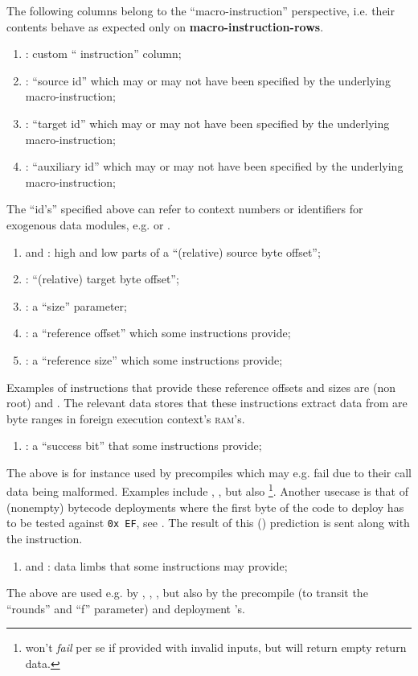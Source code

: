 The following columns belong to the ``macro-instruction'' perspective, i.e. their contents behave as expected only on 
\textbf{macro-instruction-rows}. 
\begin{enumerate}
	\item \macroInst{}:
		custom ``\mmuMod{} instruction'' column;
	\item \macroSrcId{}:
		``source id'' which may or may not have been specified by the underlying macro-instruction;
	\item \macroTgtId{}:
		``target id'' which may or may not have been specified by the underlying macro-instruction;
	\item \macroAuxId{}:
		``auxiliary id'' which may or may not have been specified by the underlying macro-instruction;
\end{enumerate}
The ``id's'' specified above can refer to context numbers or identifiers for exogenous data modules, e.g. \kecStamp{} or \cfi{}.
\begin{enumerate}[resume]
	\item \macroSrcOffsetHi{} and \macroSrcOffsetLo{}:
		high and low parts of a ``(relative) source byte offset'';
	\item \macroTgtOffsetLo{}:
		``(relative) target byte offset'';
	\item \macroSize{}:
		a ``size'' parameter;
	\item \macroRefOffset{}:
		a ``reference offset'' which some instructions provide;
	\item \macroRefSize{}:  
		a ``reference size'' which some instructions provide;
\end{enumerate}
Examples of instructions that provide these reference offsets and sizes are (non root)  and .
The relevant data stores that these instructions extract data from are byte ranges in foreign execution context's \textsc{ram}'s.
\begin{enumerate}[resume]
	\item \macroSuccessBit{}:
		a ``success bit'' that some instructions provide;
\end{enumerate}
The above is for instance used by precompiles which may e.g. fail due to their call data being malformed.
Examples include \instEcadd{}, \instEcmul{}, \instEcpairing{} but also \instEcrecover{}\footnote{\instEcrecover{} won't \emph{fail} per se if provided with invalid inputs, but will return empty return data.}.
Another usecase is that of (nonempty) bytecode deployments where the first byte of the code to deploy has to be tested against \texttt{0x\,EF},
see \cite{EIP-3541}.
The result of this (\hubMod{}) prediction is sent along with the \mmuMod{} instruction.
\begin{enumerate}[resume]
	\item \macroLimbOne{} and \macroLimbTwo{}:
		data limbs that some instructions may provide;
\end{enumerate}
The above are used e.g. by
,
,
,
but also by the \instBlake{} precompile (to transit the ``rounds'' and ``f'' parameter)
and deployment 's.

